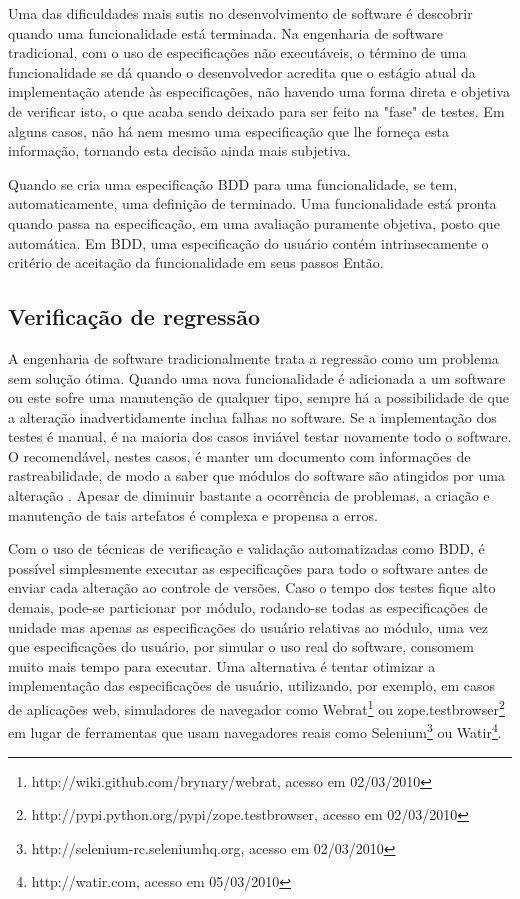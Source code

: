 \documentclass[a4paper,abntfigtabnum,noindentfirst]{abnt}
\begin{document}
Uma das dificuldades mais sutis no desenvolvimento de software é descobrir quando uma funcionalidade está terminada. Na engenharia de software tradicional, com o uso de especificações não executáveis, o término de uma funcionalidade se dá quando o desenvolvedor acredita que o estágio atual da implementação atende às especificações, não havendo uma forma direta e objetiva de verificar isto, o que acaba sendo deixado para ser feito na "fase" de testes. Em alguns casos, não há nem mesmo uma especificação que lhe forneça esta informação, tornando esta decisão ainda mais subjetiva.

Quando se cria uma especificação BDD para uma funcionalidade, se tem, automaticamente, uma definição de terminado. Uma funcionalidade está pronta quando passa na especificação, em uma avaliação puramente objetiva, posto que automática. Em BDD, uma especificação do usuário contém intrinsecamente o critério de aceitação da funcionalidade em seus passos Então.


\subsection{Verificação de regressão}

A engenharia de software tradicionalmente trata a regressão como um problema sem solução ótima. Quando uma nova funcionalidade é adicionada a um software ou este sofre uma manutenção de qualquer tipo, sempre há a possibilidade de que a alteração inadvertidamente inclua falhas no software. Se a implementação dos testes é manual, é na maioria dos casos inviável testar novamente todo o software. O recomendável, nestes casos, é manter um documento com informações de rastreabilidade, de modo a saber que módulos do software são atingidos por uma alteração \cite{EngSoftPressman} \cite{EngSoftSommerville}. Apesar de diminuir bastante a ocorrência de problemas, a criação e manutenção de tais artefatos é complexa e propensa a erros.

Com o uso de técnicas de verificação e validação automatizadas como BDD, é possível simplesmente executar as especificações para todo o software antes de enviar cada alteração ao controle de versões. Caso o tempo dos testes fique alto demais, pode-se particionar por módulo, rodando-se todas as especificações de unidade mas apenas as especificações do usuário relativas ao módulo, uma vez que especificações do usuário, por simular o uso real do software, consomem muito mais tempo para executar. Uma alternativa é tentar otimizar a implementação das especificações de usuário, utilizando, por exemplo, em casos de aplicações web, simuladores de navegador como Webrat\footnote{http://wiki.github.com/brynary/webrat, acesso em 02/03/2010} ou zope.testbrowser\footnote{http://pypi.python.org/pypi/zope.testbrowser, acesso em 02/03/2010} em lugar de ferramentas que usam navegadores reais como Selenium\footnote{http://selenium-rc.seleniumhq.org, acesso em 02/03/2010} ou Watir\footnote{http://watir.com, acesso em 05/03/2010}.



\end{document}
